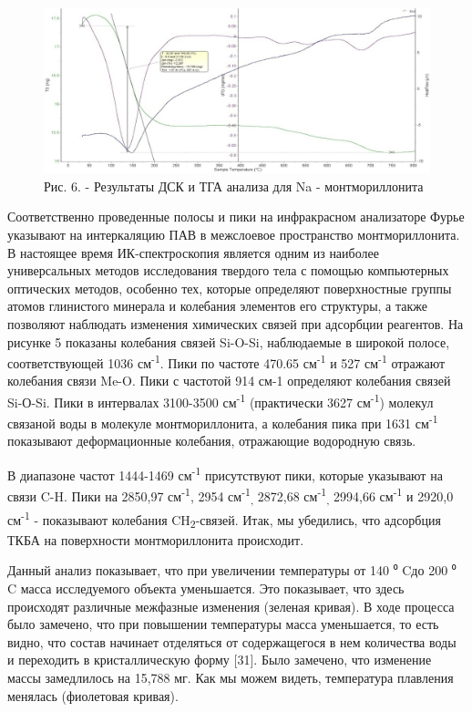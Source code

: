 \begin{figure}[H]
	\centering
	\includegraphics[width=\textwidth]{assets/1031}
	\caption*{Рис. 6. - Результаты ДСК и ТГА анализа для Na - монтмориллонита}
\end{figure}

\begin{multicols}{2}
Соответственно проведенные полосы и пики на инфракрасном анализаторе
Фурье указывают на интеркаляцию ПАВ в межслоевое пространство
монтмориллонита. В настоящее время ИК-спектроскопия является одним из
наиболее универсальных методов исследования твердого тела с помощью
компьютерных оптических методов, особенно тех, которые определяют
поверхностные группы атомов глинистого минерала и колебания элементов
его структуры, а также позволяют наблюдать изменения химических связей
при адсорбции реагентов. На рисунке 5 показаны колебания связей Si-O-Si,
наблюдаемые в широкой полосе, соответствующей 1036
см\textsuperscript{-1}. Пики по частоте 470.65 см\textsuperscript{-1} и
527 см\textsuperscript{-1} отражают колебания связи Me-O. Пики с
частотой 914 см-1 определяют колебания связей Si-О-Si. Пики в интервалах
3100-3500 см\textsuperscript{-1} (практически 3627
см\textsuperscript{-1}) молекул связаной воды в молекуле
монтмориллонита, а колебания пика при 1631 см\textsuperscript{-1}
показывают деформационные колебания, отражающие водородную связь.

В диапазоне частот 1444-1469 см\textsuperscript{-1} присутствуют пики,
которые указывают на связи C-H. Пики на 2850,97 см\textsuperscript{-1},
2954 см\textsuperscript{-1}\textsubscript{,} 2872,68
см\textsuperscript{-1}\textsubscript{,} 2994,66 см\textsuperscript{-1} и
2920,0 см\textsuperscript{-1} - показывают колебания
CH\textsubscript{2}-связей. Итак, мы убедились, что адсорбция ТКБА на
поверхности монтмориллонита происходит.

Данный анализ показывает, что при увеличении температуры от 140 ⁰ Cдо
200 ⁰ C масса исследуемого объекта уменьшается. Это показывает, что
здесь происходят различные межфазные изменения (зеленая кривая). В ходе
процесса было замечено, что при повышении температуры масса уменьшается,
то есть видно, что состав начинает отделяться от содержащегося в нем
количества воды и переходить в кристаллическую форму {[}31{]}. Было
замечено, что изменение массы замедлилось на 15,788 мг. Как мы можем
видеть, температура плавления менялась (фиолетовая кривая).
\end{multicols}

